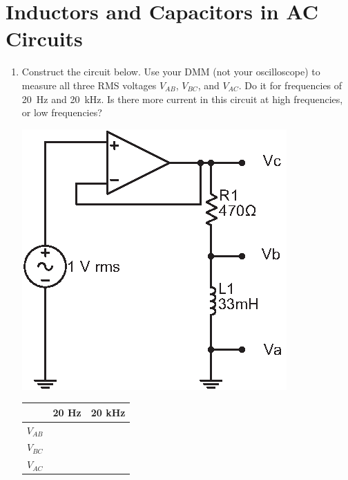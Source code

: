 \section{Inductors and Capacitors in AC Circuits }
\label{lab_ac_circuits}


\bigskip

\begin{enumerate}[wide]

\item Construct the circuit below.  Use your DMM (not your oscilloscope) to measure all three RMS voltages $V_{AB}$,  $V_{BC}$, and $V_{AC}$.  Do it for frequencies of 20~Hz and 20~kHz.  Is there more current in this circuit at high frequencies, or low frequencies? 

\begin{minipage}{.55\textwidth}
\begin{center}
\includegraphics{ac_circuits/RandL.eps}
\end{center}
\end{minipage}
\begin{minipage}{.4\textwidth}
\begin{center} 
\begin{tabular}{|c|c|c|} 
\hline & 20 Hz & 20 kHz \\ 
\hline $V_{AB}$ & & \\ 
\hline $V_{BC}$ & & \\ 
\hline $V_{AC}$ & & \\ 
\hline 
\end{tabular} 
\end{center}
\end{minipage}



\end{enumerate}
